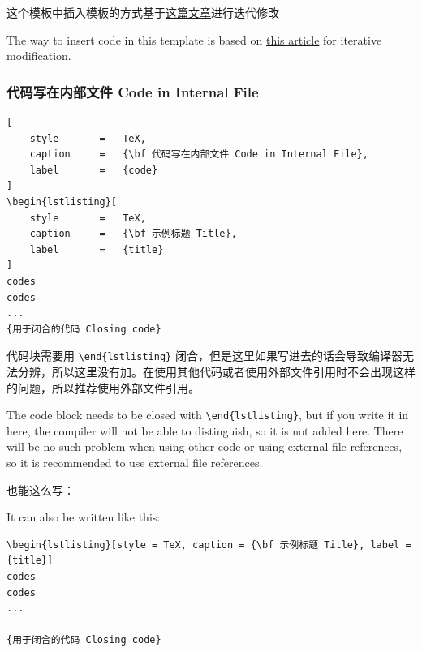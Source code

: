 \documentclass{article}
\begin{document}
这个模板中插入模板的方式基于\href{https://zhuanlan.zhihu.com/p/65441079}{这篇文章}进行迭代修改

The way to insert code in this template is based on \href{https://zhuanlan.zhihu.com/p/65441079}{this article} for iterative modification.


\subsubsection{代码写在内部文件 Code in Internal File}

\begin{lstlisting}[
    style       =   TeX,
    caption     =   {\bf 代码写在内部文件 Code in Internal File},
    label       =   {code}
]
\begin{lstlisting}[
    style       =   TeX,
    caption     =   {\bf 示例标题 Title},
    label       =   {title}
]
codes
codes
...
{用于闭合的代码 Closing code}
\end{lstlisting}  %

代码块需要用 \verb|\end{lstlisting}| 闭合，但是这里如果写进去的话会导致编译器无法分辨，所以这里没有加。在使用其他代码或者使用外部文件引用时不会出现这样的问题，所以推荐使用外部文件引用。

The code block needs to be closed with \verb|\end{lstlisting}|, but if you write it in here, the compiler will not be able to distinguish, so it is not added here. There will be no such problem when using other code or using external file references, so it is recommended to use external file references.


\vspace{0.5cm}

也能这么写：

It can also be written like this:

\begin{lstlisting}[style = TeX, caption = {\bf 代码写在内部文件 Code in Internal File}, label = {code}]
\begin{lstlisting}[style = TeX, caption = {\bf 示例标题 Title}, label = {title}]
codes
codes
...

{用于闭合的代码 Closing code}
\end{lstlisting}
\end{document}
